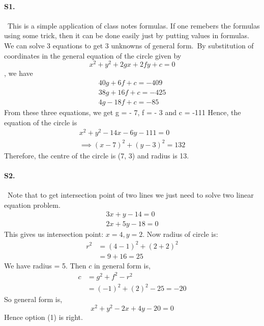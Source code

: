 \documentclass{article}
\begin{document}
\paragraph{S1.}\
This is a simple application of class notes formulas. If one remebers the formulas using some trick, then it can be done easily just by putting values in formulas. We can solve 3 equations to get 3 unknowns of general form.\
By substitution of coordinates in the general equation of the  circle given by
$$x^2 + y^2 + 2gx + 2fy + c = 0$$, we have
\begin{align*}
    40g + 6f + c = - 409\\
    38g + 16 f + c = - 425\\
    4g - 18 f + c = - 85
\end{align*}
From these three equations, we get
g = - 7, f = - 3 and c = -111
Hence, the equation of the circle is
\begin{align*}
    x^2 + y^2 - 14x - 6y - 111 = 0\\
    \implies (x - 7)^2 + (y - 3)^2 = 132
\end{align*}
Therefore, the centre of the circle is (7, 3) and radius is 13.

\paragraph{S2.}\
Note that to get intersection point of two lines we just need to solve two linear equation problem.
\begin{align*}
    3x + y - 14 = 0\\
    2x + 5y - 18 = 0
\end{align*}
This gives us intersection point: $x=4, y=2$. Now radius of circle is:
\begin{align*}
    r^2&=(4-1)^2+(2+2)^2\\
    &=9+16=25
\end{align*}
We have radius = 5. Then $c$ in general form is,
\begin{align*}
    c&=g^2+f^2-r^2\\
    &=(-1)^2+(2)^2-25=-20
\end{align*} 
So general form is,
$$x^2 + y^2 - 2x + 4y - 20 = 0$$
Hence option (1) is right.
\end{document}

